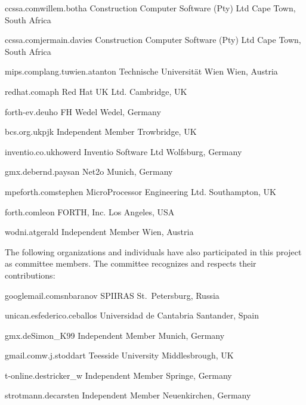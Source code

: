	{ccssa.com}{willem.botha}
	{Construction Computer Software (Pty) Ltd}
	{Cape Town, South Africa}

	{ccssa.com}{jermain.davies}
	{Construction Computer Software (Pty) Ltd}
	{Cape Town, South Africa}

	{mips.complang.tuwien.at}{anton}
	{Technische Universit\"at Wien}
	{Wien, Austria}

	{redhat.com}{aph}
	{Red Hat UK Ltd.}
	{Cambridge, UK}

	{forth-ev.de}{uho}
	{FH Wedel}
	{Wedel, Germany}

	{bcs.org.uk}{pjk}
	{Independent Member}
	{Trowbridge, UK}

	{inventio.co.uk}{howerd}
	{Inventio Software Ltd}
	{Wolfsburg, Germany}

	{gmx.de}{bernd.paysan}
	{Net2o}
	{Munich, Germany}

	{mpeforth.com}{stephen}
	{MicroProcessor Engineering Ltd.}
	{Southampton, UK}

	{forth.com}{leon}
	{FORTH, Inc.}
	{Los Angeles, USA}

	{wodni.at}{gerald}
	{Independent Member}
	{Wien, Austria}

The following organizations and individuals have also participated in
this project as committee members. The committee recognizes and
respects their contributions:

	{googlemail.com}{snbaranov}
	{SPIIRAS}
	{St.\ Petersburg, Russia}

	{unican.es}{federico.ceballos}
	{Universidad de Cantabria}
	{Santander, Spain}

	{gmx.de}{Simon\_K99}
	{Independent Member}
	{Munich, Germany}

	{gmail.com}{w.j.stoddart}
	{Teesside University}
	{Middlesbrough, UK}

	{t-online.de}{stricker\_w}
	{Independent Member}
	{Springe, Germany}

	{strotmann.de}{carsten}
	{Independent Member}
	{Neuenkirchen, Germany}

